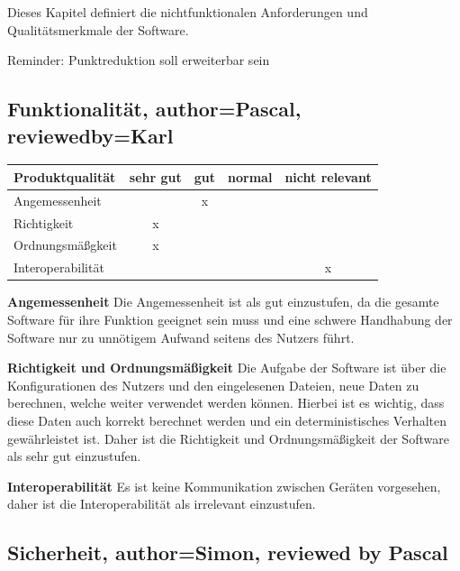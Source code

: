 \documentclass[parskip=full]{scrartcl} %
\begin{document}
Dieses Kapitel definiert die nichtfunktionalen Anforderungen und Qualitätsmerkmale der Software.

Reminder: Punktreduktion soll erweiterbar sein



\subsection{Funktionalität, author=Pascal, reviewedby=Karl}

\begin{tabular}{|l| c| c| c| c|}
    \hline
        Produktqualität & sehr gut & gut & normal & nicht relevant \\
    \hline
        Angemessenheit & & x & &\\
    \hline
        Richtigkeit & x & & &\\
    \hline
        Ordnungsmäßgkeit & x & & &\\
    \hline
        Interoperabilität & & & & x\\
    \hline
        
    \end{tabular}

\textbf{Angemessenheit}
\newline
Die Angemessenheit ist als gut einzustufen, da die gesamte Software für ihre Funktion geeignet sein muss und eine schwere Handhabung der Software nur zu unnötigem Aufwand seitens des Nutzers führt.



\textbf{Richtigkeit und Ordnungsmäßigkeit}
\newline
Die Aufgabe der Software ist über die Konfigurationen des Nutzers und den eingelesenen Dateien, neue Daten zu berechnen, welche weiter verwendet werden können. Hierbei ist es wichtig, dass diese Daten auch korrekt berechnet werden und ein deterministisches Verhalten gewährleistet ist.
Daher ist die Richtigkeit und Ordnungsmäßigkeit der Software als sehr gut einzustufen.

\textbf{Interoperabilität}
\newline
Es ist keine Kommunikation zwischen Geräten vorgesehen, daher ist die Interoperabilität als irrelevant einzustufen.


\newpage 

\subsection{Sicherheit, author=Simon, reviewed by Pascal}
\end{document}
